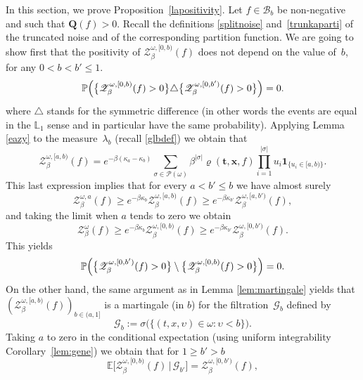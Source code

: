 \documentclass[10pt]{amsart}
\let\mathcal\mathscr
\let\sep:
\theoremstyle{definition}
\newcommand{\bt}{\boldsymbol{t}}
\newcommand{\bx}{\boldsymbol{x}}
\newcommand{\ind}{\mathbf{1}}
\newcommand{\cB}{{\ensuremath{\mathcal B}} }
\newcommand{\cP}{{\ensuremath{\mathcal P}} }
\newcommand{\cZ}{{\ensuremath{\mathcal Z}} }
\newcommand{\bQ}{{\ensuremath{\mathbf Q}} }
\newcommand{\bbE}{{\ensuremath{\mathbb E}} }
\newcommand{\bbL}{{\ensuremath{\mathbb L}} }
\newcommand{\bbP}{{\ensuremath{\mathbb P}} }
\let\gb\beta
\let\gl\lambda
\let\ups\upsilon
\let\go\omega
\begin{document}
In this section, we prove Proposition~\ref{lapositivity}.
Let $f\in \cB_b$ be non-negative and such that $\bQ(f)> 0$.
Recall the definitions \eqref{splitnoise} and~\eqref{trunkaparti} of the truncated noise and of the corresponding partition function. We are going to show first that the positivity of $\cZ^{\go,[0,b)}_\beta (f)$ does not depend on the value of~$b$,
for any $ 0<b< b'\le 1$.
\begin{equation}\label{ekwalzs}
\bbP\Bigl(\bigl\{ \cZ^{\go,[0,b)}_\beta (f)>0 \bigr\} \triangle \bigl\{ \cZ^{\go,[0,b')}_\beta (f) >0 \bigr\} \Bigr) =0.
\end{equation}
where $\triangle$ stands for the symmetric difference (in other words the events are equal in the $\bbL_1$ sense and in particular have the same probability).
Applying Lemma \ref{eazy} to the measure~$\gl_b$ (recall \eqref{glbdef}) we obtain that
\begin{equation}
\cZ^{\go,[a,b)}_\beta(f)= e^{-\gb (\kappa_a-\kappa_b)} \sum_{\sigma\in \cP(\go)} \beta^{|\sigma|} \varrho(\bt,\bx, f) \prod_{i=1}^{|\sigma|} u_i\ind_{\{ u_i\in[a,b) \}}.
\end{equation}
This last expression implies that for every $a<b' \leq b$ we have almost surely
\begin{equation}
\label{eq:ZaZab}
\cZ^{\go,a}_\beta (f) \ge e^{-\gb\kappa_b}\cZ^{\go,[a,b)}_\beta (f) \ge e^{-\gb\kappa_{b'}} \cZ^{\go,[a,b')}_\beta (f),
\end{equation}
and taking the limit when $a$ tends to zero we obtain
\begin{equation}
\cZ^{\go}_\beta (f) \ge e^{-\gb\kappa_b} \cZ^{\go,[0,b)}_\beta (f) \ge e^{-\gb\kappa_{b'}} \cZ^{\go,[0,b')}_\beta (f).
\end{equation}
This yields
\[
\bbP\Bigl(\bigl\{ \cZ^{\go,[0,b')}_\beta (f)>0 \bigr\} \setminus \bigl\{ \cZ^{\go,[0,b)}_\beta (f) >0 \bigr\} \Bigr) =0.
\]
On the other hand, the same argument as in Lemma \ref{lem:martingale} yields that $
(\cZ^{\go,[a,b)}_\beta (f))_{b\in(a,1]}$ is a martingale (in $b$) for the filtration~$\mathcal{G}_b$ defined by
\begin{equation}
\mathcal G_b:= \sigma \bigl(\{ (t,x,\ups)\in \go \sep \ups <b \}\bigr).
\end{equation}
Taking $a$ to zero in the conditional expectation (using uniform integrability \cf Corol\-lary~\ref{lem:gene}) we obtain that for $1\geq b'>b$
\begin{equation}
\bbE \bigl[ \cZ^{\go,[0, b)}_\beta (f) \, \big| \, \mathcal G_{ b'} \bigr]= \cZ^{\go,[0, b')}_\beta (f),
\end{equation}
\end{document}
